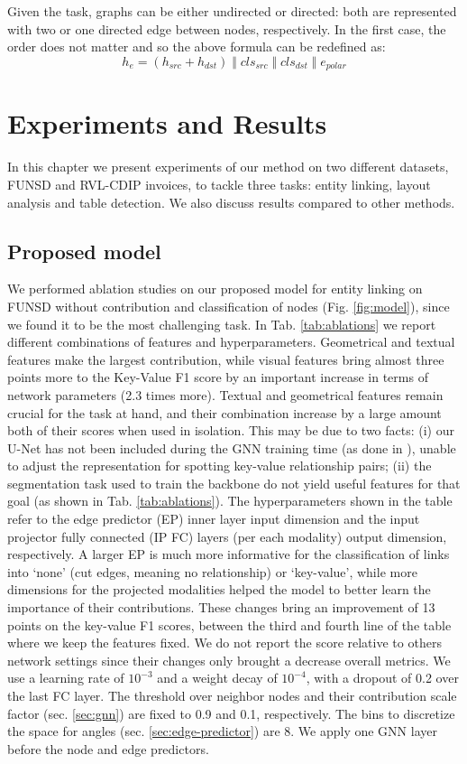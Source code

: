 \documentclass[runningheads]{llncs}
\begin{document}
Given the task, graphs can be either undirected or directed: both are represented with two or one directed edge between nodes, respectively. In the first case, the order does not matter and so the above formula can be redefined as:
\begin{equation}
    h_e = (h_{src} + h_{dst})\;\Vert\;cls_{src}\;\Vert\;cls_{dst}\;\Vert\;e_{polar}
\end{equation}
 
\section{Experiments and Results}\label{s:results}
In this chapter we present experiments of our method on two different datasets, FUNSD and RVL-CDIP invoices, to tackle three tasks: entity linking, layout analysis and table detection. We also discuss results compared to other methods.

\subsection{Proposed model}
We performed ablation studies on our proposed model for entity linking on FUNSD without contribution and classification of nodes (Fig. \ref{fig:model}), since we found it to be the most challenging task. In Tab. \ref{tab:ablations} we report different combinations of features and hyperparameters. Geometrical and textual features make the largest contribution, while visual features bring almost three points more to the Key-Value F1 score by an important increase in terms of network parameters (2.3 times more). Textual and geometrical features remain crucial for the task at hand, and their combination increase by a large amount both of their scores when used in isolation. This may be due to two facts: (i) our U-Net has not been included during the GNN training time (as done in \cite{davis2021visual}), unable to adjust the representation for spotting key-value relationship pairs; (ii) the segmentation task used to train the backbone do not yield useful features for that goal (as shown in Tab. \ref{tab:ablations}).
The hyperparameters shown in the table refer to the edge predictor (EP) inner layer input dimension and the input projector fully connected (IP FC) layers (per each modality) output dimension, respectively. A larger EP is much more informative for the classification of links into `none' (cut edges, meaning no relationship) or `key-value', while more dimensions for the projected modalities helped the model to better learn the importance of their contributions. These changes bring an improvement of 13 points on the key-value F1 scores, between the third and fourth line of the table where we keep the features fixed. We do not report the score relative to others network settings since their changes only brought a decrease overall metrics. We use a learning rate of $10^{-3}$ and a weight decay of $10^{-4}$, with a dropout of 0.2 over the last FC layer. The threshold over neighbor nodes and their contribution scale factor (sec. \ref{sec:gnn}) are fixed to 0.9 and 0.1, respectively. The bins to discretize the space for angles (sec. \ref{sec:edge-predictor}) are 8. We apply one GNN layer before the node and edge predictors.
\end{document}
